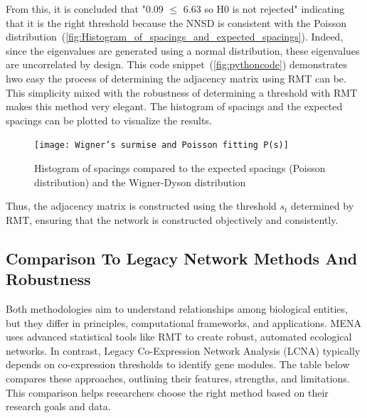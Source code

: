 From this, it is concluded that "0.09 $\leq$ 6.63 so H0 is not rejected" indicating that it is the right threshold because the NNSD is consistent with the Poisson distribution~(\autoref{fig:Histogram_of_spacings_and_expected_spacings}).
Indeed, since the eigenvalues are generated using a normal distribution, these eigenvalues are uncorrelated by design.
This code snippet~(\autoref{fig:pythoncode}) demonstrates hwo easy the process of determining the adjacency matrix using RMT can be.
This simplicity mixed with the robustness of determining a threshold with RMT makes this method very elegant.
The histogram of spacings and the expected spacings can be plotted to visualize the results.

\begin{figure}[H]
    \centering
    \texttt{[image: Wigner’s surmise and Poisson fitting P(s)]} %
    \caption{Histogram of spacings compared to the expected spacings (Poisson distribution) and the Wigner-Dyson distribution}
    \label{fig:Histogram_of_spacings_and_expected_spacings}
\end{figure}

\noindent Thus, the adjacency matrix is constructed using the threshold $s_t$ determined by RMT, ensuring that the network is constructed objectively and consistently.

\subsection{Comparison To Legacy Network Methods And Robustness}\label{subsec:comparison-to-legacy-network-methods-and-robustness}

Both methodologies aim to understand relationships among biological entities, but they differ in principles, computational frameworks, and applications.
MENA uses advanced statistical tools like RMT to create robust, automated ecological networks.
In contrast, Legacy Co-Expression Network Analysis (LCNA) typically depends on co-expression thresholds to identify gene modules.
The table below compares these approaches, outlining their features, strengths, and limitations.
This comparison helps researchers choose the right method based on their research goals and data.

